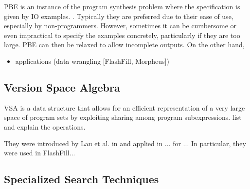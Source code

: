 
\ac{PBE} is an instance of the program synthesis problem where the specification
is given by \ac{IO} examples.
.
Typically they are preferred due to their ease of use, especially by
non-programmers.
However, sometimes it can be cumbersome or even impractical to specify the
examples concretely, particularly if they are too large.
 \ac{PBE} can then be relaxed to allow
incomplete outputs.
On the other hand, 

\begin{itemize}
\item applications (data wrangling [FlashFill, Morpheus])
\end{itemize}

\subsection{Version Space Algebra}



\ac{VSA} is a data structure that allows for an efficient representation of a
very large space of program sets by exploiting sharing among program
subexpressions.  {list and explain the operations}.

They were introduced by Lau et al. in \cite{Lau:2000} and applied in ... for ...
In particular, they were used in FlashFill...


\subsection{Specialized Search Techniques}
\label{sec:pbe-search-techniques}


